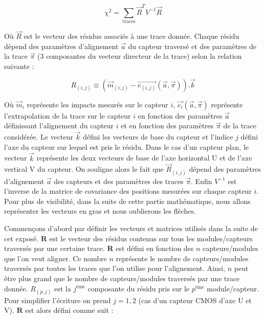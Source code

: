    \begin{equation}
    \chi^2 = \sum_{\text{traces}} \vec{R}^T V^{-1} \vec{R}
   \end{equation}

   O\`u $\vec{R}$ est le vecteur des r\'esidus associ\'es \`a une trace donn\'ee. Chaque r\'esidu d\'epend des param\`etres d'alignement $\vec{a}$ du capteur travers\'e et des param\`etres de la trace $\vec{\pi}$ (3 composantes du vecteur directeur de la trace) selon la relation suivante :
   
   \begin{equation}
    R_{(i,j)} \equiv (\vec{m}_{(i,j)} - \vec{e_{(i,j)}}(\vec{a},\vec{\pi})).\vec{k}
   \end{equation}
      
   O\`u $\vec{m}_i$ repr\'esente les impacts mesur\'es sur le capteur $i$, $\vec{e_i}(\vec{a},\vec{\pi})$ repr\'esente l'extrapolation de la trace sur le capteur $i$ en fonction des param\`etres $\vec{a}$ d\'efinissant l'alignement du capteur $i$ et en fonction des param\`etres $\vec{\pi}$ de la trace consid\'er\'ee. Le vecteur $\vec{k}$ d\'efini les vecteurs de base du capteur et l'indice $j$ d\'efini l'axe du capteur sur lequel est pris le r\'esidu. Dans le cas d'un capteur plan, le vecteur $\vec{k}$ repr\'esente les deux vecteurs de base de l'axe horizontal U et de l'axe vertical V du capteur. On souligne alors le fait que $\vec{R}_{(i,j)}$ d\'epend des param\`etres d'alignement $\vec{a}$ des capteurs et des param\`etres des traces $\vec{\pi}$. Enfin $V^{-1}$ est l'inverse de la matrice de covariance des positions mesur\'ees sur chaque capteur $i$. Pour plus de visibilit\'e, dans la suite de cette partie math\'ematique, nous allons repr\'esenter les vecteurs en gras et nous oublierons les fl\`eches.

   \medskip
   
   Commen\c{c}ons d'abord par d\'efinir les vecteurs et matrices utilis\'es dans la suite de cet expos\'e. $\mathbf{R}$ est le vecteur des r\'esidus contenus sur tous les modules/capteurs travers\'es par une certaine trace. $\mathbf{R}$ est d\'efini en fonction des $n$ capteurs/modules que l'on veut aligner. Ce nombre $n$ repr\'esente le nombre de capteurs/modules travers\'es par toutes les traces que l'on utilise pour l'alignement. Ainsi, $n$ peut \^etre plus grand que le nombre de capteurs/modules travers\'es par une trace donn\'ee. $R_{(p,j)}$ est la $j^{\text{\`eme}}$ composante du r\'esidu pris sur le $p^{\text{\`eme}}$ module/capteur. Pour simplifier l'\'ecriture on prend $j=1,2$ (cas d'un capteur CMOS d'axe U et V). $\mathbf{R}$ est alors d\'efini comme suit :
   

